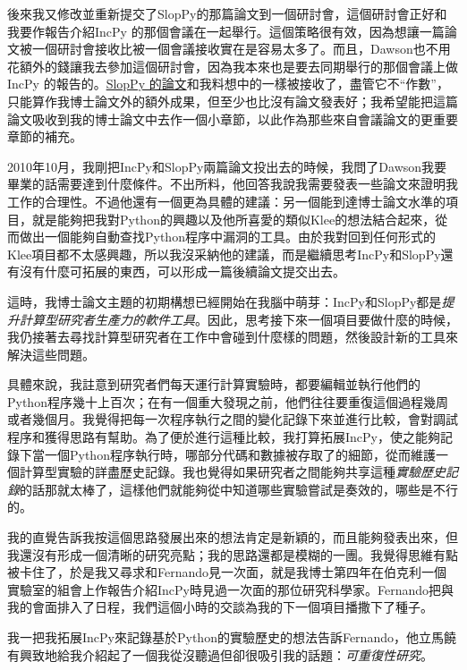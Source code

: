 \documentclass[12pt,UTF8,nofonts]{book}
\begin{document}
後來我又修改並重新提交了SlopPy的那篇論文到一個研討會，這個研討會正好和我要作報告介紹IncPy 的那個會議在一起舉行。這個策略很有效，因為想讓一篇論文被一個研討會接收比被一個會議接收實在是容易太多了。而且，Dawson也不用花額外的錢讓我去參加這個研討會，因為我本來也是要去同期舉行的那個會議上做IncPy 的報告的。\href{http://www.pgbovine.net/projects/pubs/guo_woda11_camera_ready.pdf}{SlopPy 的論文}和我料想中的一樣被接收了，盡管它不“作數”，只能算作我博士論文外的額外成果，但至少也比沒有論文發表好；我希望能把這篇論文吸收到我的博士論文中去作一個小章節，以此作為那些來自會議論文的更重要章節的補充。

\breakline

2010年10月，我剛把IncPy和SlopPy兩篇論文投出去的時候，我問了Dawson我要畢業的話需要達到什麼條件。不出所料，他回答我說我需要發表一些論文來證明我工作的合理性。不過他還有一個更為具體的建議：另一個能到達博士論文水準的項目，就是能夠把我對Python的興趣以及他所喜愛的類似Klee的想法結合起來，從而做出一個能夠自動查找Python程序中漏洞的工具。由於我對回到任何形式的Klee項目都不太感興趣，所以我沒采納他的建議，而是繼續思考IncPy和SlopPy還有沒有什麼可拓展的東西，可以形成一篇後續論文提交出去。

這時，我博士論文主題的初期構想已經開始在我腦中萌芽：IncPy和SlopPy都是\emph{提升計算型研究者生產力的軟件工具}。因此，思考接下來一個項目要做什麼的時候，我仍接著去尋找計算型研究者在工作中會碰到什麼樣的問題，然後設計新的工具來解決這些問題。

具體來說，我註意到研究者們每天運行計算實驗時，都要編輯並執行他們的Python程序幾十上百次；在有一個重大發現之前，他們往往要重復這個過程幾周或者幾個月。我覺得把每一次程序執行之間的變化記錄下來並進行比較，會對調試程序和獲得思路有幫助。為了便於進行這種比較，我打算拓展IncPy，使之能夠記錄下當一個Python程序執行時，哪部分代碼和數據被存取了的細節，從而維護一個計算型實驗的詳盡歷史記錄。我也覺得如果研究者之間能夠共享這種\emph{實驗歷史記錄}的話那就太棒了，這樣他們就能夠從中知道哪些實驗嘗試是奏效的，哪些是不行的。

我的直覺告訴我按這個思路發展出來的想法肯定是新穎的，而且能夠發表出來，但我還沒有形成一個清晰的研究亮點；我的思路還都是模糊的一團。我覺得思維有點被卡住了，於是我又尋求和Fernando見一次面，就是我博士第四年在伯克利一個實驗室的組會上作報告介紹IncPy時見過一次面的那位研究科學家。Fernando把與我的會面排入了日程，我們這個小時的交談為我的下一個項目播撒下了種子。

\breakline

我一把我拓展IncPy來記錄基於Python的實驗歷史的想法告訴Fernando，他立馬饒有興致地給我介紹起了一個我從沒聽過但卻很吸引我的話題：\emph{可重復性研究}。
\end{document}
